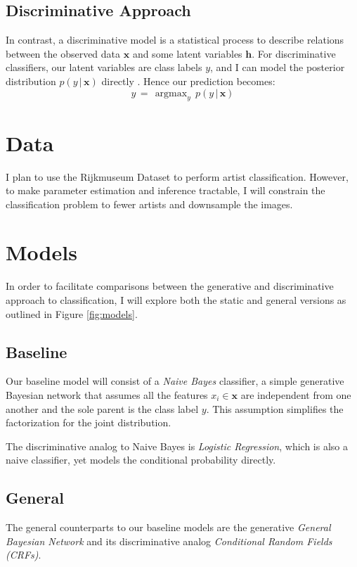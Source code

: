 \documentclass{article}
\DeclareMathOperator*{\argmax}{argmax}
\begin{document}
\subsection{Discriminative Approach}
In contrast, a discriminative model is a statistical process to describe
relations between the observed data $\mathbf{x}$ and some latent variables
$\mathbf{h}$. For discriminative classifiers, our latent variables are class
labels $y$, and I can model the posterior distribution $p(y\,|\,\mathbf{x})$
directly \cite{NgJordan}. Hence our prediction becomes:
\begin{equation}
  \hat{y} \,=\, \argmax_y \, p(y \,|\, \mathbf{x})
\end{equation}

\section{Data}
I plan to use the Rijkmuseum Dataset \cite{Rijksmuseum} to perform artist
classification. However, to make parameter estimation and inference tractable,
I will constrain the classification problem to fewer artists and downsample
the images.


\section{Models}
In order to facilitate comparisons between the generative and discriminative
approach to classification, I will explore both the static and general versions
as outlined in Figure \ref{fig:models}.

\subsection{Baseline}
Our baseline model will consist of a \textit{Naive Bayes} classifier, a simple generative
Bayesian network that assumes all the features $x_i \in \mathbf{x}$ are
independent from one another and the sole parent is the class label $y$. This
assumption simplifies the factorization for the joint distribution.

The discriminative analog to Naive Bayes is \textit{Logistic Regression}, which is
also a naive classifier, yet models the conditional probability directly.

\subsection{General}
The general counterparts to our baseline models are the generative
\textit{General Bayesian Network} and its discriminative analog
\textit{Conditional Random Fields (CRFs)}.
\end{document}

